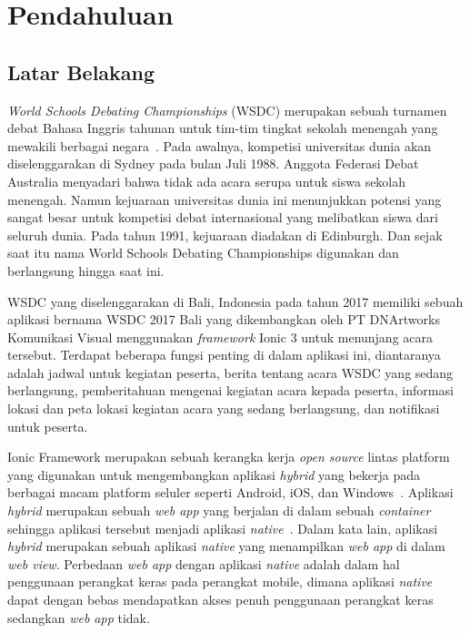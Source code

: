 \chapter{Pendahuluan}
\label{chap:intro}
   
\section{Latar Belakang}
\label{sec:label}

\textit{World Schools Debating Championships} (WSDC) merupakan sebuah turnamen debat Bahasa Inggris tahunan untuk tim-tim tingkat sekolah menengah yang mewakili berbagai negara~\cite{wsdc}. Pada awalnya, kompetisi universitas dunia akan diselenggarakan di Sydney pada bulan Juli 1988. Anggota Federasi Debat Australia menyadari bahwa tidak ada acara serupa untuk siswa sekolah menengah. Namun kejuaraan universitas dunia ini menunjukkan potensi yang sangat besar untuk kompetisi debat internasional yang melibatkan siswa dari seluruh dunia. Pada tahun 1991, kejuaraan diadakan di Edinburgh. Dan sejak saat itu nama World Schools Debating Championships digunakan dan berlangsung hingga saat ini. 

WSDC yang diselenggarakan di Bali, Indonesia pada tahun 2017 memiliki sebuah aplikasi bernama WSDC 2017 Bali yang dikembangkan oleh PT DNArtworks Komunikasi Visual menggunakan \textit{framework} Ionic 3 untuk menunjang acara tersebut. Terdapat beberapa fungsi penting di dalam aplikasi ini, diantaranya adalah jadwal untuk kegiatan peserta, berita tentang acara WSDC yang sedang berlangsung, pemberitahuan mengenai kegiatan acara kepada peserta, informasi lokasi dan peta lokasi kegiatan acara yang sedang berlangsung, dan notifikasi untuk peserta. 

Ionic Framework merupakan sebuah kerangka kerja {\it open source} lintas platform yang digunakan untuk mengembangkan aplikasi \textit{hybrid} yang bekerja pada berbagai macam platform seluler seperti Android, iOS, dan Windows~\cite{waranashiwar:18:ionic}. Aplikasi \textit{hybrid} merupakan sebuah \textit{web app} yang berjalan di dalam sebuah \textit{container} sehingga aplikasi tersebut menjadi aplikasi \textit{native}~\cite{yusuf:16:ionic}. Dalam kata lain, aplikasi \textit{hybrid} merupakan sebuah aplikasi \textit{native} yang menampilkan \textit{web app} di dalam \textit{web view}. Perbedaan \textit{web app} dengan aplikasi \textit{native} adalah dalam hal penggunaan perangkat keras pada perangkat mobile, dimana aplikasi \textit{native} dapat dengan bebas mendapatkan akses penuh penggunaan perangkat keras sedangkan \textit{web app} tidak.

